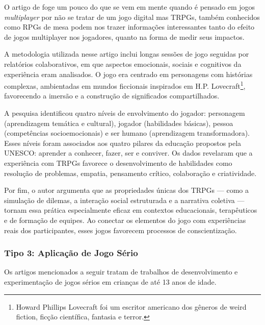 O artigo de  foge um pouco do que se vem em mente quando é pensado em jogos \textit{multiplayer} por não se tratar de um jogo digital mas TRPGs, também conhecidos como RPGs de mesa podem nos trazer informações interessantes tanto do efeito de jogos multiplayer nos jogadores, quanto na forma de medir seus impactos.

A metodologia utilizada nesse artigo inclui longas sessões de jogo seguidas por relatórios colaborativos, em que aspectos emocionais, sociais e cognitivos da experiência eram analisados. O jogo era centrado em personagens com histórias complexas, ambientadas em mundos ficcionais inspirados em H.P. Lovecraft\footnote{Howard Phillips Lovecraft foi um escritor americano dos gêneros de weird fiction, ficção científica, fantasia e terror.}, favorecendo a imersão e a construção de significados compartilhados.

A pesquisa identificou quatro níveis de envolvimento do jogador: personagem (aprendizagem temática e cultural), jogador (habilidades básicas), pessoa (competências socioemocionais) e ser humano (aprendizagem transformadora). Esses níveis foram associados aos quatro pilares da educação propostos pela UNESCO: aprender a conhecer, fazer, ser e conviver. Os dados revelaram que a experiência com TRPGs favorece o desenvolvimento de habilidades como resolução de problemas, empatia, pensamento crítico, colaboração e criatividade.

Por fim, o autor argumenta que as propriedades únicas dos TRPGs — como a simulação de dilemas, a interação social estruturada e a narrativa coletiva — tornam essa prática especialmente eficaz em contextos educacionais, terapêuticos e de formação de equipes. Ao conectar os elementos do jogo com experiências reais dos participantes, esses jogos favorecem processos de conscientização.

\subsubsection{Tipo 3: Aplicação de Jogo Sério}
Os artigos mencionados a seguir tratam de trabalhos de desenvolvimento e experimentação de jogos sérios em crianças de até 13 anos de idade.


